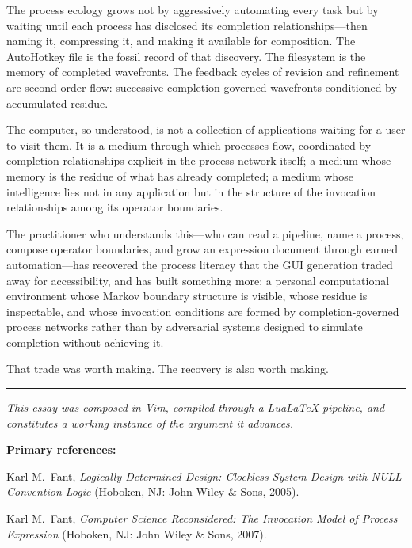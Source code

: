 \documentclass[12pt, a4paper]{article}
\begin{document}
The process ecology grows not by aggressively automating every task
but by waiting until each process has disclosed its completion
relationships---then naming it, compressing it, and making it
available for composition. The AutoHotkey file is the fossil record
of that discovery. The filesystem is the memory of completed
wavefronts. The feedback cycles of revision and refinement are
second-order flow: successive completion-governed wavefronts
conditioned by accumulated residue.

The computer, so understood, is not a collection of applications
waiting for a user to visit them. It is a medium through which
processes flow, coordinated by completion relationships explicit
in the process network itself; a medium whose memory is the
residue of what has already completed; a medium whose intelligence
lies not in any application but in the structure of the invocation
relationships among its operator boundaries.

The practitioner who understands this---who can read a pipeline,
name a process, compose operator boundaries, and grow an expression
document through earned automation---has recovered the process
literacy that the GUI generation traded away for accessibility,
and has built something more: a personal computational environment
whose Markov boundary structure is visible, whose residue is
inspectable, and whose invocation conditions are formed by
completion-governed process networks rather than by adversarial
systems designed to simulate completion without achieving it.

That trade was worth making. The recovery is also worth making.

\vspace{2em}
\begin{center}\rule{0.4\textwidth}{0.4pt}\end{center}
\vspace{1em}

\noindent\textit{This essay was composed in Vim, compiled through a
LuaLaTeX pipeline, and constitutes a working instance of the argument
it advances.}

\vspace{2em}
\noindent\textbf{Primary references:}

\noindent Karl M.\ Fant, \textit{Logically Determined Design: Clockless
System Design with NULL Convention Logic} (Hoboken, NJ: John Wiley \&
Sons, 2005).

\smallskip
\noindent Karl M.\ Fant, \textit{Computer Science Reconsidered: The
Invocation Model of Process Expression} (Hoboken, NJ: John Wiley \&
Sons, 2007).
\end{document}
